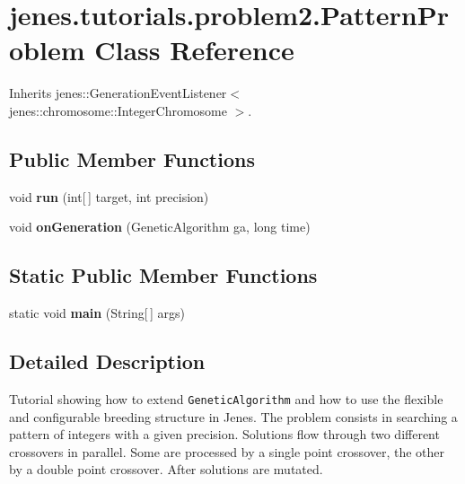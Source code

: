 \hypertarget{classjenes_1_1tutorials_1_1problem2_1_1_pattern_problem}{
\section{jenes.tutorials.problem2.PatternProblem Class Reference}
\label{classjenes_1_1tutorials_1_1problem2_1_1_pattern_problem}
}
Inherits jenes::GenerationEventListener$<$ jenes::chromosome::IntegerChromosome $>$.

\subsection*{Public Member Functions}
\begin{CompactItemize}
\item 
\hypertarget{classjenes_1_1tutorials_1_1problem2_1_1_pattern_problem_e9d7568d540e52512e2e6ce589c624bd}{
void \textbf{run} (int\mbox{[}$\,$\mbox{]} target, int precision)}
\label{classjenes_1_1tutorials_1_1problem2_1_1_pattern_problem_e9d7568d540e52512e2e6ce589c624bd}

\item 
\hypertarget{classjenes_1_1tutorials_1_1problem2_1_1_pattern_problem_32a0d783caa7bc42a8bb8b96ce0e4fe2}{
void \textbf{onGeneration} (GeneticAlgorithm ga, long time)}
\label{classjenes_1_1tutorials_1_1problem2_1_1_pattern_problem_32a0d783caa7bc42a8bb8b96ce0e4fe2}

\end{CompactItemize}
\subsection*{Static Public Member Functions}
\begin{CompactItemize}
\item 
\hypertarget{classjenes_1_1tutorials_1_1problem2_1_1_pattern_problem_194be818fd81bffd0167012016a7035c}{
static void \textbf{main} (String\mbox{[}$\,$\mbox{]} args)}
\label{classjenes_1_1tutorials_1_1problem2_1_1_pattern_problem_194be818fd81bffd0167012016a7035c}

\end{CompactItemize}


\subsection{Detailed Description}
Tutorial showing how to extend {\tt GeneticAlgorithm} and how to use the flexible and configurable breeding structure in Jenes. The problem consists in searching a pattern of integers with a given precision. Solutions flow through two different crossovers in parallel. Some are processed by a single point crossover, the other by a double point crossover. After solutions are mutated.

